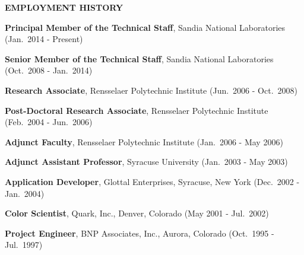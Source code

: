 
\vspace{\sectionskip}
\noindent
{\large \textbf{EMPLOYMENT HISTORY}}
\vspace{\sectionskip}

\begin{minipage}{\minipagewidth}
\textbf{Principal Member of the Technical Staff}, Sandia National Laboratories (Jan.~2014 - Present)
\end{minipage}\vspace{\parskip}

\begin{minipage}{\minipagewidth}
\textbf{Senior Member of the Technical Staff}, Sandia National Laboratories (Oct.~2008 - Jan.~2014)
\end{minipage}\vspace{\parskip}

\begin{minipage}{\minipagewidth}
\textbf{Research Associate}, Rensselaer Polytechnic Institute (Jun.~2006 - Oct.~2008)
\end{minipage}\vspace{\parskip}

\begin{minipage}{\minipagewidth}
\textbf{Post-Doctoral Research Associate}, Rensselaer Polytechnic Institute (Feb.~2004 - Jun.~2006)
\end{minipage}\vspace{\parskip}

\begin{minipage}{\minipagewidth}
\textbf{Adjunct Faculty}, Rensselaer Polytechnic Institute (Jan.~2006 - May 2006)
\end{minipage}\vspace{\parskip}

\begin{minipage}{\minipagewidth}
\textbf{Adjunct Assistant Professor}, Syracuse University (Jan.~2003 - May 2003)
\end{minipage}\vspace{\parskip}

\begin{minipage}{\minipagewidth}
\textbf{Application Developer}, Glottal Enterprises, Syracuse, New York (Dec.~2002 - Jan.~2004)
\end{minipage}\vspace{\parskip}

\begin{minipage}{\minipagewidth}
\textbf{Color Scientist}, Quark, Inc., Denver, Colorado (May 2001 - Jul.~2002)
\end{minipage}\vspace{\parskip}

\begin{minipage}{\minipagewidth}
\textbf{Project Engineer}, BNP Associates, Inc., Aurora, Colorado (Oct.~1995 - Jul.~1997)
\end{minipage}\vspace{\parskip}

\newpage
\pagestyle{fancy}
\cfoot{}
\setlength{\headheight}{\myheadheight}
\setlength{\topmargin}{\mytopmargin}

